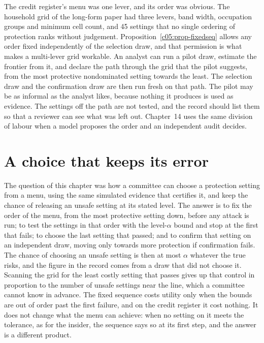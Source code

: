 The credit register's menu was one lever, and its order was obvious. The household
grid of the long-form paper had three levers, band width, occupation groups and minimum
cell count, and 45 settings that no single ordering of protection ranks without
judgement. Proposition~\ref{c05:prop-fixedseq} allows any order fixed independently of
the selection draw, and that permission is what makes a multi-lever grid workable. An
analyst can run a pilot draw, estimate the frontier from it, and declare the path through
the grid that the pilot suggests, from the most protective nondominated setting towards
the least. The selection draw and the confirmation draw are then run fresh on that path.
The pilot may be as informal as the analyst likes, because nothing it produces is used as
evidence. The settings off the path are not tested, and the record should list them so
that a reviewer can see what was left out. Chapter~14 uses the same division of labour
when a model proposes the order and an independent audit decides.

\section{A choice that keeps its error}

The question of this chapter was how a committee can choose a protection setting from a
menu, using the same simulated evidence that certifies it, and keep the chance of
releasing an unsafe setting at its stated level. The answer is to fix the order of the
menu, from the most protective setting down, before any attack is run; to test the
settings in that order with the level-$\alpha$ bound and stop at the first that fails; to
choose the last setting that passed; and to confirm that setting on an independent draw,
moving only towards more protection if confirmation fails. The chance of choosing an
unsafe setting is then at most $\alpha$ whatever the true risks, and the figure in the
record comes from a draw that did not choose it. Scanning the grid for the least costly
setting that passes gives up that control in proportion to the number of unsafe settings
near the line, which a committee cannot know in advance. The fixed sequence costs utility
only when the bounds are out of order past the first failure, and on the credit register
it cost nothing. It does not change what the menu can achieve: when no setting on it
meets the tolerance, as for the insider, the sequence says so at its first step, and the
answer is a different product.

